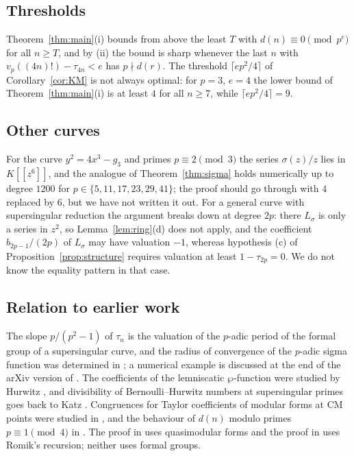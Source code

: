 \documentclass[11pt]{amsart}
\theoremstyle{definition}
\theoremstyle{remark}
\begin{document}
\subsection{Thresholds} Theorem~\ref{thm:main}(i) bounds from above the least $T$ with
$d(n)\equiv0\pmod{p^e}$ for all $n\ge T$, and by (ii) the bound is sharp whenever the last $n$ with
$v_p((4n)!)-\tau_{4n}<e$ has $p\nmid d(r)$. The threshold $\lceil ep^2/4\rceil$ of Corollary~\ref{cor:KM} is not
always optimal: for $p=3$, $e=4$ the lower bound of Theorem~\ref{thm:main}(i) is at least $4$ for
all $n\ge7$, while $\lceil ep^2/4\rceil=9$.

\subsection{Other curves} For the curve $y^2=4x^3-g_3$ and primes $p\equiv2\pmod3$ the series
$\sigma(z)/z$ lies in $K[[z^6]]$, and the analogue of Theorem~\ref{thm:sigma} holds numerically up
to degree $1200$ for $p\in\{5,11,17,23,29,41\}$; the proof should go through with $4$ replaced by
$6$, but we have not written it out. For a general curve with
supersingular reduction the argument breaks down at degree $2p$: there $L_\sigma$ is only a series
in $z^2$, so Lemma~\ref{lem:ring}(d) does not apply, and the coefficient $b_{2p-1}/(2p)$ of
$L_\sigma$ may have valuation $-1$, whereas hypothesis (c) of Proposition~\ref{prop:structure}
requires valuation at least $1-\tau_{2p}=0$. We do not know the equality pattern in that case.

\subsection{Relation to earlier work} The slope $p/(p^2-1)$ of $\tau_n$ is the valuation of the
$p$-adic period of the formal group of a supersingular curve, and the radius of convergence of the
$p$-adic sigma function \cite{MT} was determined in \cite{BKY}; a numerical example is discussed at the end
of the arXiv version of \cite{BK}. The coefficients of the lemniscatic $\wp$-function were
studied by Hurwitz \cite{Hurwitz}, and divisibility of Bernoulli--Hurwitz numbers at supersingular
primes goes back to Katz \cite{Katz}. Congruences for Taylor coefficients of modular forms at CM
points were studied in \cite{LarsonSmith}, and the behaviour of $d(n)$ modulo primes
$p\equiv1\pmod4$ in \cite{GMR,Wakhare}. The proof in \cite{KimLee} uses quasimodular forms and
the proof in \cite{KM} uses Romik's recursion; neither uses formal groups.
\end{document}
